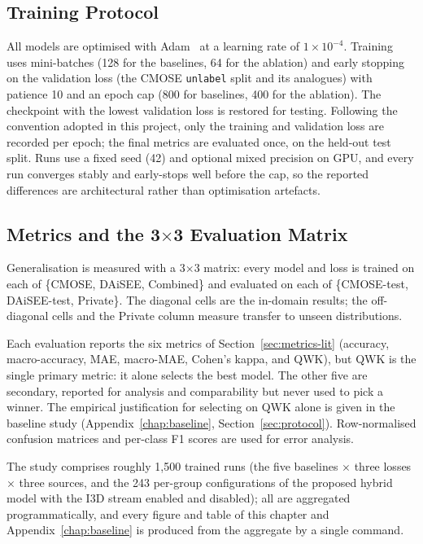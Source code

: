 \documentclass[../main.tex]{subfiles}
\begin{document}
\subsection{Training Protocol}
\label{sec:training}

All models are optimised with Adam~\cite{adam} at a learning rate of $1\times10^{-4}$. Training uses mini-batches (128 for the baselines, 64 for the ablation) and early stopping on the validation loss (the CMOSE \texttt{unlabel} split and its analogues) with patience 10 and an epoch cap (800 for baselines, 400 for the ablation). The checkpoint with the lowest validation loss is restored for testing. Following the convention adopted in this project, only the training and validation loss are recorded per epoch; the final metrics are evaluated once, on the held-out test split. Runs use a fixed seed (42) and optional mixed precision on GPU, and every run converges stably and early-stops well before the cap, so the reported differences are architectural rather than optimisation artefacts.

\subsection{Metrics and the 3$\times$3 Evaluation Matrix}
\label{sec:eval}

Generalisation is measured with a 3$\times$3 matrix: every model and loss is trained on each of \{CMOSE, DAiSEE, Combined\} and evaluated on each of \{CMOSE-test, DAiSEE-test, Private\}. The diagonal cells are the in-domain results; the off-diagonal cells and the Private column measure transfer to unseen distributions.

Each evaluation reports the six metrics of Section~\ref{sec:metrics-lit} (accuracy, macro-accuracy, MAE, macro-MAE, Cohen's kappa, and QWK), but QWK is the single primary metric: it alone selects the best model. The other five are secondary, reported for analysis and comparability but never used to pick a winner. The empirical justification for selecting on QWK alone is given in the baseline study (Appendix~\ref{chap:baseline}, Section~\ref{sec:protocol}). Row-normalised confusion matrices and per-class F1 scores are used for error analysis.

The study comprises roughly 1{,}500 trained runs (the five baselines $\times$ three losses $\times$ three sources, and the 243 per-group configurations of the proposed hybrid model with the I3D stream enabled and disabled); all are aggregated programmatically, and every figure and table of this chapter and Appendix~\ref{chap:baseline} is produced from the aggregate by a single command.
\end{document}
